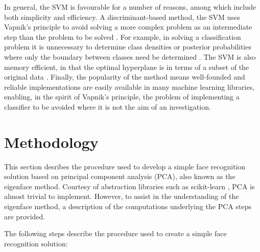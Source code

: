 In general, the SVM is favourable for a number of reasons, among which include both simplicity and efficiency. A discriminant-based method, the SVM uses Vapnik's principle to avoid solving a more complex problem as an intermediate step than the problem to be solved \cite{alpaydin_2020}. For example, in solving a classification problem it is unnecessary to determine class densities or posterior probabilities where only the boundary between classes need be determined \cite{alpaydin_2020}. The SVM is also memory efficient, in that the optimal hyperplane is in terms of a subset of the original data \cite{alpaydin_2020}. Finally, the popularity of the method means well-founded and reliable implementations are easily available in many machine learning libraries, enabling, in the spirit of Vapnik's principle, the problem of implementing a classifier to be avoided where it is not the aim of an investigation.

\newpage
\section{Methodology}

This section desribes the procedure used to develop a simple face recognition solution based on principal component analysis (PCA), also known as the eigenface method. Courtesy of abstraction libraries such as scikit-learn \cite{scikitlearn_2023}, PCA is almost trivial to implement. However, to assist in the understanding of the eigenface method, a description of the computations underlying the PCA steps are provided.

The following steps describe the procedure used to create a simple face recognition solution:

